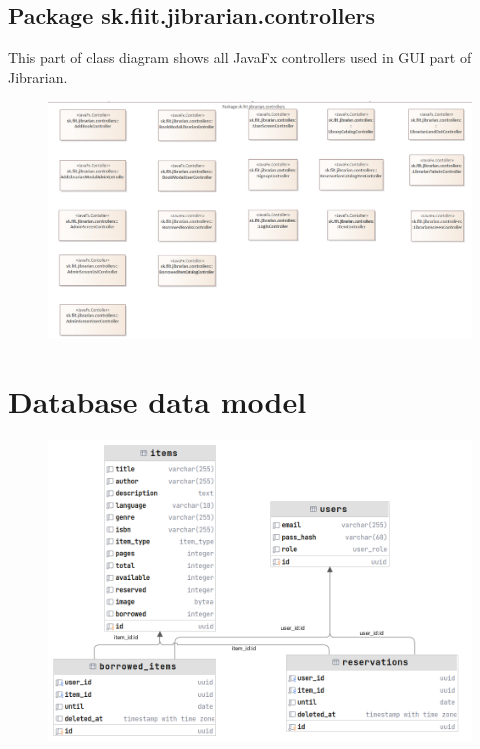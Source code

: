 \documentclass[11pt,twoside,a4paper]{article}
\begin{document}
\pagebreak
\subsection{Package sk.fiit.jibrarian.controllers}

This part of class diagram shows all JavaFx controllers used in GUI part of Jibrarian.

\begin{figure}[!ht]
    \includegraphics[scale=.4]{../ea/Class Diagram controllers.png}
    \centering
\end{figure}

\pagebreak
\section{Database data model}
\begin{figure}[!ht]
    \includegraphics[scale=.6]{../db-diagram.png}
    \centering
\end{figure}
\end{document}
